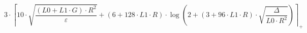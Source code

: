 \[3 \cdot \left\lceil 10 \cdot \sqrt{\frac{\left(L0 + L1 \cdot G\right) \cdot R^{2}}{\varepsilon}} + \left(6 + 128 \cdot L1 \cdot R\right) \cdot \log\left(2 + \left(3 + 96 \cdot L1 \cdot R\right) \cdot \sqrt{\frac{\Delta}{L0 \cdot R^{2}}}\right) \right\rceil_{+}\]

